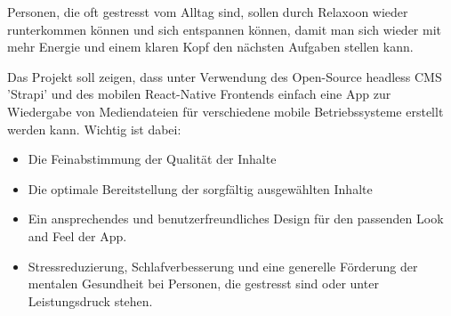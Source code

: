 
Personen, die oft gestresst vom Alltag sind, sollen durch Relaxoon wieder runterkommen können
und sich entspannen können, damit man sich wieder mit mehr Energie und einem klaren Kopf den
nächsten Aufgaben stellen kann.

Das Projekt soll zeigen, dass unter Verwendung des Open-Source headless CMS 'Strapi' und des mobilen
React-Native Frontends einfach eine App zur Wiedergabe von Mediendateien für verschiedene mobile Betriebssysteme
erstellt werden kann. Wichtig ist dabei: 

\begin{itemize}
    \item Die Feinabstimmung der Qualität der Inhalte
    \item Die optimale Bereitstellung der sorgfältig ausgewählten Inhalte
    \item Ein ansprechendes und benutzerfreundliches Design für den passenden Look and Feel der App.
    \item Stressreduzierung, Schlafverbesserung und eine generelle Förderung der mentalen Gesundheit bei
          Personen, die gestresst sind oder unter Leistungsdruck stehen.
\end{itemize}


